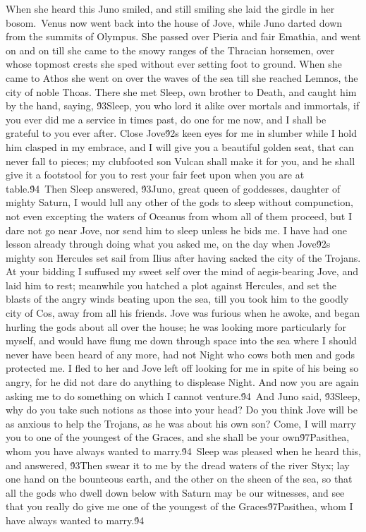 {When she heard this Juno smiled, and still smiling she laid the girdle in her bosom.\
Venus now went back into the house of Jove, while Juno darted down from the summits of Olympus. She passed over Pieria and fair Emathia, and went on and on till she came to the snowy ranges of the Thracian horsemen, over whose topmost crests she sped without ever setting foot to ground. When she came to Athos she went on over the waves of the sea till she reached Lemnos, the city of noble Thoas. There she met Sleep, own brother to Death, and caught him by the hand, saying, \'93Sleep, you who lord it alike over mortals and immortals, if you ever did me a service in times past, do one for me now, and I shall be grateful to you ever after. Close Jove\'92s keen eyes for me in slumber while I hold him clasped in my embrace, and I will give you a beautiful golden seat, that can never fall to pieces; my clubfooted son Vulcan shall make it for you, and he shall give it a footstool for you to rest your fair feet upon when you are at table.\'94\
Then Sleep answered, \'93Juno, great queen of goddesses, daughter of mighty Saturn, I would lull any other of the gods to sleep without compunction, not even excepting the waters of Oceanus from whom all of them proceed, but I dare not go near Jove, nor send him to sleep unless he bids me. I have had one lesson already through doing what you asked me, on the day when Jove\'92s mighty son Hercules set sail from Ilius after having sacked the city of the Trojans. At your bidding I suffused my sweet self over the mind of aegis-bearing Jove, and laid him to rest; meanwhile you hatched a plot against Hercules, and set the blasts of the angry winds beating upon the sea, till you took him to the goodly city of Cos, away from all his friends. Jove was furious when he awoke, and began hurling the gods about all over the house; he was looking more particularly for myself, and would have flung me down through space into the sea where I should never have been heard of any more, had not Night who cows both men and gods protected me. I fled to her and Jove left off looking for me in spite of his being so angry, for he did not dare do anything to displease Night. And now you are again asking me to do something on which I cannot venture.\'94\
And Juno said, \'93Sleep, why do you take such notions as those into your head? Do you think Jove will be as anxious to help the Trojans, as he was about his own son? Come, I will marry you to one of the youngest of the Graces, and she shall be your own\'97Pasithea, whom you have always wanted to marry.\'94\
Sleep was pleased when he heard this, and answered, \'93Then swear it to me by the dread waters of the river Styx; lay one hand on the bounteous earth, and the other on the sheen of the sea, so that all the gods who dwell down below with Saturn may be our witnesses, and see that you really do give me one of the youngest of the Graces\'97Pasithea, whom I have always wanted to marry.\'94\
}
